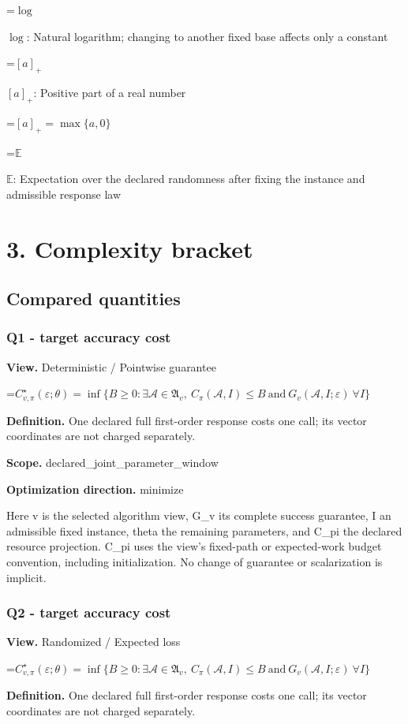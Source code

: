 \documentclass[10pt,a4paper]{article}
\newcommand{\AtlasMath}[1]{\par\begingroup\centering\setbox0=\hbox{$\displaystyle #1$}\ifdim\wd0>1.4\linewidth\typeout{ATLAS WIDE FORMULA: \the\wd0}\fi\ifdim\wd0>\linewidth\resizebox{\linewidth}{!}{\box0}\else\box0\fi\par\endgroup}
\newcommand{\AtlasInlineMath}[1]{\begingroup\setbox0=\hbox{$#1$}\ifdim\wd0>.4\linewidth\endgroup\AtlasMath{#1}\else\endgroup$#1$\fi}
\begin{document}
\AtlasInlineMath{\log}: Natural logarithm; changing to another fixed base affects only a constant

\AtlasInlineMath{[a]_+}: Positive part of a real number


\AtlasMath{[a]_+=\max\{a,0\}}


\AtlasInlineMath{\mathbb{E}}: Expectation over the declared randomness after fixing the instance and admissible response law

\section{3. Complexity bracket}
\subsection{Compared quantities}
\subsubsection{Q1 - target accuracy cost}
\textbf{View.} Deterministic / Pointwise guarantee

\AtlasMath{C^\star_{v,\pi}(\varepsilon;\theta)=\inf\{B\ge0:\exists\mathcal A\in\mathfrak A_v,\ C_\pi(\mathcal A,I)\le B\ \text{and}\ G_v(\mathcal A,I;\varepsilon)\ \forall I\}}
\textbf{Definition.} One declared full first-order response costs one call; its vector coordinates are not charged separately.

\textbf{Scope.} declared\_joint\_parameter\_window

\textbf{Optimization direction.} minimize

Here v is the selected algorithm view, G\_v its complete success guarantee, I an admissible fixed instance, theta the remaining parameters, and C\_pi the declared resource projection. C\_pi uses the view's fixed-path or expected-work budget convention, including initialization. No change of guarantee or scalarization is implicit.

\subsubsection{Q2 - target accuracy cost}
\textbf{View.} Randomized / Expected loss

\AtlasMath{C^\star_{v,\pi}(\varepsilon;\theta)=\inf\{B\ge0:\exists\mathcal A\in\mathfrak A_v,\ C_\pi(\mathcal A,I)\le B\ \text{and}\ G_v(\mathcal A,I;\varepsilon)\ \forall I\}}
\textbf{Definition.} One declared full first-order response costs one call; its vector coordinates are not charged separately.
\end{document}

